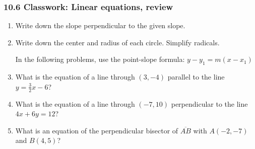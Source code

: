 \documentclass[12pt, twoside]{article}
\begin{document}
\subsubsection*{10.6 Classwork: Linear equations, review}
  \begin{enumerate}

  \item Write down the slope perpendicular to the given slope. \vspace{0.5cm}
  \begin{enumerate}
  \end{enumerate} \vspace{1cm}

  \item Write down the center and radius of each circle. Simplify radicals.
  \begin{enumerate}
  \end{enumerate}  \vspace{2cm}

  In the following problems, use the point-slope formula: $y-y_1=m (x-x_1)$
  \item What is the equation of a line through $(3,-4)$ parallel to the line $y=\frac{3}{2}x-6$?  \vspace{2cm}
  \item What is the equation of a line through $(-7,10)$ perpendicular to the line $4x+6y=12$?  \vspace{3cm}
  
  \item What is an equation of the perpendicular bisector of $\overline{AB}$ with $A(-2,-7)$ and $B(4,5)$? \vspace{2cm}


\end{enumerate}
\end{document}

